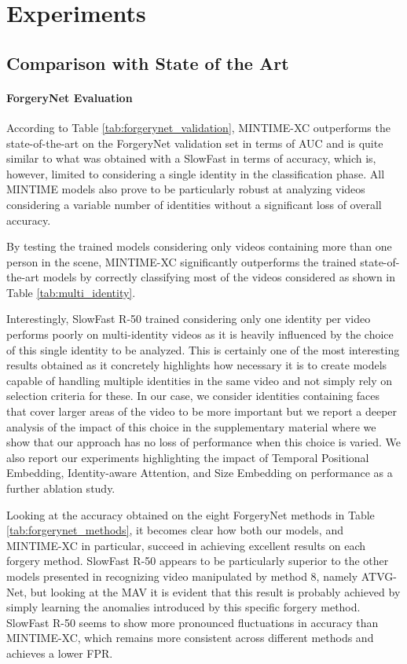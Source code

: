 \documentclass[10pt,twocolumn,letterpaper]{article}
\begin{document}
\section{Experiments}
\subsection{Comparison with State of the Art}
\paragraph{ForgeryNet Evaluation}
According to Table \ref{tab:forgerynet_validation}, MINTIME-XC outperforms the state-of-the-art on the ForgeryNet validation set in terms of AUC and is quite similar to what was obtained with a SlowFast in terms of accuracy, which is, however, limited to considering a single identity in the classification phase.  
All MINTIME models also prove to be particularly robust at analyzing videos considering a variable number of identities without a significant loss of overall accuracy.

By testing the trained models considering only videos containing more than one person in the scene, MINTIME-XC significantly outperforms the trained state-of-the-art models by correctly classifying most of the videos considered as shown in Table \ref{tab:multi_identity}.

Interestingly, SlowFast R-50 trained considering only one identity per video performs poorly on multi-identity videos as it is heavily influenced by the choice of this single identity to be analyzed. This is certainly one of the most interesting results obtained as it concretely highlights how necessary it is to create models capable of handling multiple identities in the same video and not simply rely on selection criteria for these. In our case, we consider identities containing faces that cover larger areas of the video to be more important but we report a deeper analysis of the impact of this choice in the supplementary material where we show that our approach has no loss of performance when this choice is varied. We also report our experiments highlighting the impact of Temporal Positional Embedding, Identity-aware Attention, and Size Embedding on performance as a further ablation study.

Looking at the accuracy obtained on the eight ForgeryNet methods in Table \ref{tab:forgerynet_methods}, it becomes clear how both our models, and MINTIME-XC in particular, succeed in achieving excellent results on each forgery method. SlowFast R-50 appears to be particularly superior to the other models presented in recognizing video manipulated by method 8, namely ATVG-Net\cite{chen2019hierarchical}, but looking at the MAV it is evident that this result is probably achieved by simply learning the anomalies introduced by this specific forgery method. SlowFast R-50 seems to show more pronounced fluctuations in accuracy than MINTIME-XC, which remains more consistent across different methods and achieves a lower FPR.
\end{document}
